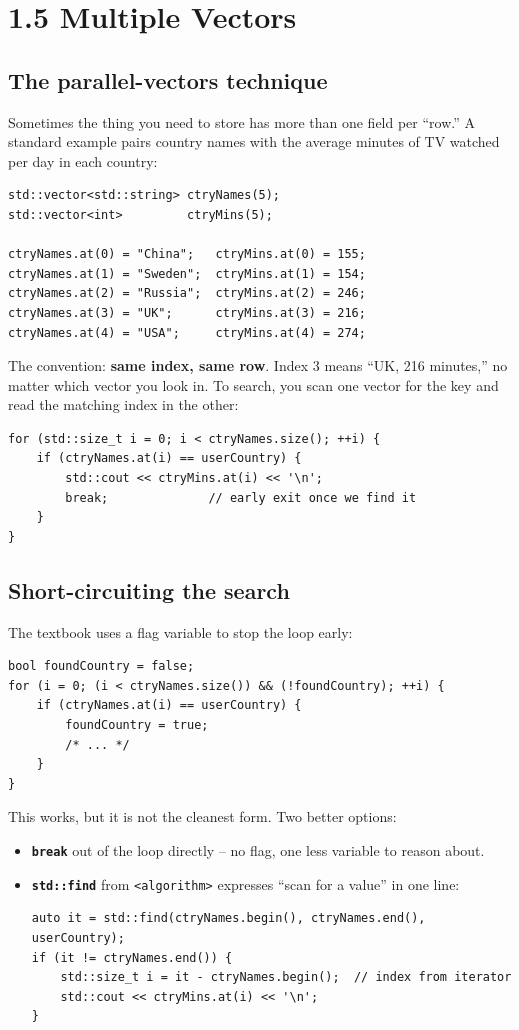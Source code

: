 \documentclass[11pt]{article}
\begin{document}
\section{1.5 Multiple Vectors}

\subsection{The parallel-vectors technique}

Sometimes the thing you need to store has more than one field per
``row.'' A standard example pairs country names with the average minutes
of TV watched per day in each country:

\begin{lstlisting}
std::vector<std::string> ctryNames(5);
std::vector<int>         ctryMins(5);

ctryNames.at(0) = "China";   ctryMins.at(0) = 155;
ctryNames.at(1) = "Sweden";  ctryMins.at(1) = 154;
ctryNames.at(2) = "Russia";  ctryMins.at(2) = 246;
ctryNames.at(3) = "UK";      ctryMins.at(3) = 216;
ctryNames.at(4) = "USA";     ctryMins.at(4) = 274;
\end{lstlisting}

The convention: \textbf{same index, same row}. Index 3 means ``UK,
216 minutes,'' no matter which vector you look in. To search, you scan
one vector for the key and read the matching index in the other:

\begin{lstlisting}
for (std::size_t i = 0; i < ctryNames.size(); ++i) {
    if (ctryNames.at(i) == userCountry) {
        std::cout << ctryMins.at(i) << '\n';
        break;              // early exit once we find it
    }
}
\end{lstlisting}

\subsection{Short-circuiting the search}

The textbook uses a flag variable to stop the loop early:
\begin{lstlisting}
bool foundCountry = false;
for (i = 0; (i < ctryNames.size()) && (!foundCountry); ++i) {
    if (ctryNames.at(i) == userCountry) {
        foundCountry = true;
        /* ... */
    }
}
\end{lstlisting}

This works, but it is not the cleanest form. Two better options:

\begin{itemize}
    \item \textbf{\texttt{break}} out of the loop directly -- no flag,
          one less variable to reason about.
    \item \textbf{\texttt{std::find}} from \texttt{<algorithm>}
          expresses ``scan for a value'' in one line:
\begin{lstlisting}
auto it = std::find(ctryNames.begin(), ctryNames.end(), userCountry);
if (it != ctryNames.end()) {
    std::size_t i = it - ctryNames.begin();  // index from iterator
    std::cout << ctryMins.at(i) << '\n';
}
\end{lstlisting}
\end{itemize}
\end{document}
